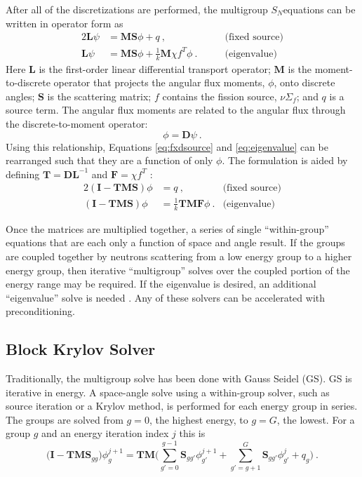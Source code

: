 \documentclass[preprint,12pt]{elsarticle}
\newcommand{\Sn}{\ensuremath{S_N}}
\newcommand{\Macro}{\ensuremath{\Sigma}}
\newcommand{\ve}[1]{\ensuremath{\mathbf{#1}}}
\begin{document}
After all of the discretizations are performed, the multigroup \Sn equations can be written in operator form as
%
\begin{alignat}{2}
  \ve{L}\psi &= \ve{MS}\phi + q \:, \qquad &\text{(fixed source)} \label{eq:fxdsource} \\
  \ve{L}\psi &= \ve{MS}\phi + \frac{1}{k}\ve{M}\chi f^{T}\phi \:. \qquad &\text{(eigenvalue)} \label{eq:eigenvalue}
\end{alignat}
%
Here $\ve{L}$ is the first-order linear differential transport operator; $\ve{M}$ is the moment-to-discrete operator that projects the angular flux moments, $\phi$, onto discrete angles; $\ve{S}$ is the scattering matrix; $f$ contains the fission source, $\nu \Macro_{f}$; and $q$ is a source term. The angular flux moments are related to the angular flux through the discrete-to-moment operator: 
\begin{equation}
 \phi = \mathbf{D} \psi \:. \label{eq:disc to mom}
\end{equation}
Using this relationship, Equations \eqref{eq:fxdsource} and \eqref{eq:eigenvalue} can be rearranged such that they are a function of only $\phi$. The formulation is aided by defining $\ve{T} = \ve{DL}^{-1}$ and $\ve{F} = \chi f^{T}$ \cite{Evans2011}:
%
\begin{alignat}{2}
  (\ve{I} - \ve{TMS})\phi &= q \:, \qquad &\text{(fixed source)} \label{eq:OperatorFxdForm} \\
  (\ve{I} - \ve{TMS})\phi &= \frac{1}{k} \ve{TMF} \phi \:. &\text{(eigenvalue)} \label{eq:OperatorEvalForm}
\end{alignat}

Once the matrices are multiplied together, a series of single ``within-group'' equations that are each only a function of space and angle result. If the groups are coupled together by neutrons scattering from a low energy group to a higher energy group, then iterative ``multigroup'' solves over the coupled portion of the energy range may be required. If the eigenvalue is desired, an additional ``eigenvalue'' solve is needed \cite{Evans2009}. Any of these solvers can be accelerated with preconditioning. 

\subsection{Block Krylov Solver}
\label{sec:blockkrylov}
Traditionally, the multigroup solve has been done with Gauss Seidel (GS). GS is iterative in energy. A space-angle solve using a within-group solver, such as source iteration or a Krylov method, is performed for each energy group in series. The groups are solved from $g=0$, the highest energy, to $g=G$, the lowest. For a group $g$ and an energy iteration index $j$ this is \cite{Evans2010}
%
\begin{equation}
  \bigl( \ve{I} - \ve{TMS}_{gg} \bigr) \phi^{j+1}_{g} = \ve{TM} \bigl( \sum_{g'=0}^{g-1}\ve{S}_{gg'}\phi^{j+1}_{g'} + \sum_{g'=g+1}^{G} \ve{S}_{gg'}\phi^{j}_{g'}  + q_{g} \bigr)  \:.
 \label{eq:up-GS}
\end{equation}
\end{document}
